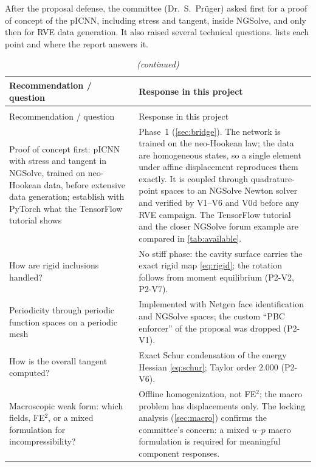 After the proposal defense, the committee (Dr.\ S.\ Pr\"uger) asked first for a
proof of concept of the pICNN, including stress and tangent, inside NGSolve, and
only then for RVE data generation. It also raised several technical questions.
 lists each point and where the report answers it.

{\small
\begin{xltabular}{\textwidth}{@{}p{5.0cm}X@{}}
\caption{Committee recommendations and their implementation.}\label{tab:committee}\\
\toprule
Recommendation / question & Response in this project\\
\midrule
\endfirsthead
\caption[]{\emph{(continued)}}\\
\toprule
Recommendation / question & Response in this project\\
\midrule
\endhead
\bottomrule
\endfoot
Proof of concept first: pICNN with stress and tangent in NGSolve, trained on neo-Hookean data, before extensive data generation; establish with PyTorch what the TensorFlow tutorial shows &
  Phase~1 (\cref{sec:bridge}). The network is trained on the neo-Hookean law; the data
  are homogeneous states, so a single element under affine displacement reproduces
  them exactly. It is coupled through quadrature-point spaces to an NGSolve Newton
  solver and verified by V1--V6 and V0d before any RVE campaign.
  The TensorFlow tutorial and the closer NGSolve forum example are compared in
  \cref{tab:available}.\\
How are rigid inclusions handled? &
  No stiff phase: the cavity surface carries the exact rigid map \cref{eq:rigid};
  the rotation follows from moment equilibrium (P2-V2, P2-V7).\\
Periodicity through periodic function spaces on a periodic mesh &
  Implemented with Netgen face identification and NGSolve  spaces;
  the custom ``PBC enforcer'' of the proposal was dropped (P2-V1).\\
How is the overall tangent computed? &
  Exact Schur condensation of the energy Hessian \cref{eq:schur}; Taylor order
  $2.000$ (P2-V6).\\
Macroscopic weak form: which fields, FE$^2$, or a mixed formulation for incompressibility? &
  Offline homogenization, not FE$^2$; the macro problem has displacements only. The
  locking analysis (\cref{sec:macro}) confirms the committee's concern: a mixed
  $u$--$p$ macro formulation is required for meaningful component responses.\\

\end{xltabular}}
